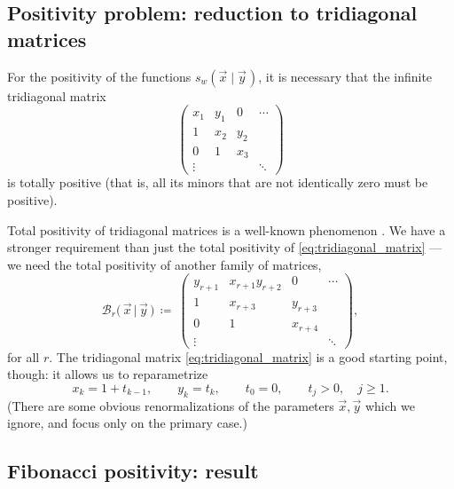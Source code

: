 \documentclass[letterpaper,11pt,oneside,reqno]{article}
\numberwithin{equation}{section}
\newcommand{\ssp}{\hspace{1pt}}
\theoremstyle{definition}
\begin{document}
\subsection{Positivity problem: reduction to tridiagonal matrices}

For the positivity of the functions
$s_w(\vec{x} \mid \vec{y}\ssp)$, it is necessary that the
infinite
tridiagonal matrix
\begin{equation}
	\label{eq:tridiagonal_matrix}
	\begin{pmatrix}
	x_1 & y_1 & 0 & \cdots\\
	1 & x_2 & y_2 &\\
	0 & 1 & x_3  & \\
	\vdots & & & \ddots
	\end{pmatrix}
\end{equation}
is totally positive (that is, all its minors that are not
identically zero must be positive).

Total positivity of tridiagonal matrices is a well-known phenomenon
\cite{FominZelevinsky1999}.
We have a stronger requirement than just the total positivity
of \eqref{eq:tridiagonal_matrix} --- we need the total positivity of
another family of matrices,
\begin{equation*}
		\mathcal{B}_r \big( \, \vec{x} \, \big| \, \vec{y} \, \big) \, \coloneqq \
		\begin{pmatrix}
		y_{r+1} & x_{r+1} y_{r+2} & 0 & \cdots\\
		1 & x_{r+3} & y_{r+3} &\\
		0 & 1 & x_{r+4}  & \\
		\vdots & & & \ddots
	\end{pmatrix},
\end{equation*}
for all $r$. The tridiagonal matrix \eqref{eq:tridiagonal_matrix} is a good starting point,
though: it allows us to reparametrize
\begin{equation*}
	x_k=1+t_{k-1},\qquad y_k=t_k,\qquad t_0=0, \qquad t_j>0, \quad j\ge 1.
\end{equation*}
(There are some obvious renormalizations of the parameters
$\vec x,\vec y$
which we ignore, and
focus only on the primary case.)

\subsection{Fibonacci positivity: result}
\end{document}
